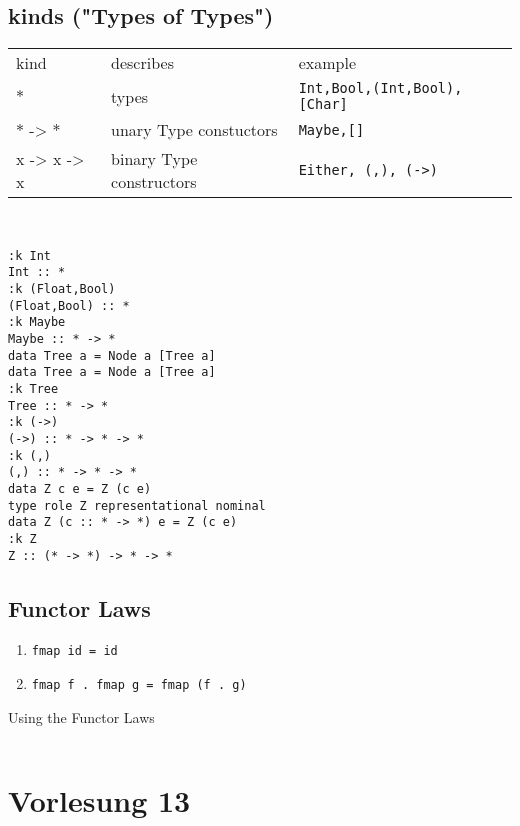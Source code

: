 \documentclass{article}
\newcommand{\Haskell}[1]{\texttt{#1}}
\begin{document}
\subsection{kinds ("Types of Types")}
\begin{tabular}{l|l|l}
kind&describes&example\\
$\ast$&types&\Haskell{Int,Bool,(Int,Bool),[Char]}\\
$\ast$ -> $\ast$&unary Type constuctors&\Haskell{Maybe,[]}\\
x -> x -> x&binary Type constructors&\Haskell{Either, (,), (->)}
\end{tabular} \\
\begin{verbatim}
:k Int
Int :: *
:k (Float,Bool)
(Float,Bool) :: *
:k Maybe
Maybe :: * -> *
data Tree a = Node a [Tree a]
data Tree a = Node a [Tree a]
:k Tree
Tree :: * -> *
:k (->)
(->) :: * -> * -> *
:k (,)
(,) :: * -> * -> *
data Z c e = Z (c e)
type role Z representational nominal
data Z (c :: * -> *) e = Z (c e)
:k Z
Z :: (* -> *) -> * -> *
\end{verbatim}
\subsection{Functor Laws}
\begin{enumerate}[1.]
\item \Haskell{fmap id = id}
\item \Haskell{fmap f . fmap g = fmap (f . g)}
\end{enumerate}
\begin{listing}
\caption{Using the Functor Laws}
\inputminted{Haskell}{Pred.hs}
\end{listing}
\clearpage
\section{Vorlesung 13}
\end{document}
